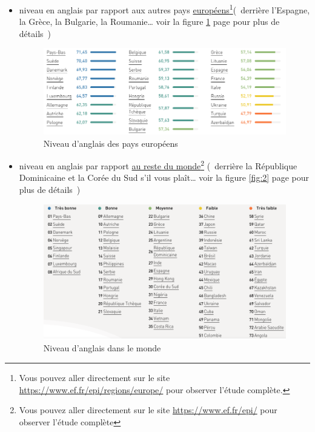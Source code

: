 \begin{itemize}
\item niveau en anglais par rapport aux autres pays
  \href{https://www.ef.fr/epi/regions/europe/}{européens}\footnote{Vous
    pouvez aller directement sur le site
    \url{https://www.ef.fr/epi/regions/europe/} pour observer l'étude complète.}(~derrière l'Espagne, la Grèce, la Bulgarie, la Roumanie\ldots{} voir la figure
  \ref{fig:1} page \pageref{fig:1} pour plus de détails~)
  \begin{figure}[h]
    \centering
    \caption[L'anglais en Europe]{Niveau d'anglais des
      pays européens}\vspace{.1cm}
    \includegraphics[scale=.5]{../img/french-english-level-in-europe}
    
    \label{fig:1}
  \end{figure}
\item niveau en anglais par rapport \href{https://www.ef.fr/epi/}{au
    reste du monde}\footnote{Vous pouvez aller directement sur le site
  \url{https://www.ef.fr/epi/} pour observer l'étude complète}
(~derrière la République Dominicaine et la Corée du Sud s'il vous
plaît\ldots{} voir la figure \ref{fig:2} page \pageref{fig:2} pour
plus de détails~)
  \begin{figure}[h]
    \centering
    \caption[L'anglais dans le monde]{Niveau d'anglais dans le monde}\vspace{.1cm}
    \includegraphics[scale=.5]{../img/english-level-in-the-world}
    

\end{figure}
\end{itemize}
